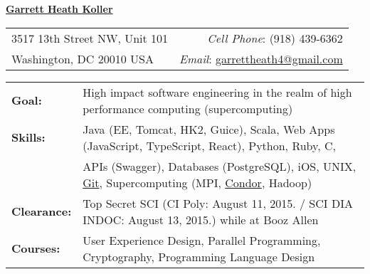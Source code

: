 \documentclass[11pt, letterpaper]{letter}
\newlength{\firstSectionSpacing} \setlength{\firstSectionSpacing}{6pt}
\newlength{\sectionSpacing}      \setlength{\sectionSpacing}{-1pt}
\begin{document}
\sffamily

\begin{center}{
	\underline{\Large{\textbf{Garrett Heath Koller}}}
}\end{center}
\vspace{-8pt}

\begin{tabular*}{\textwidth}{l@{\extracolsep{\fill}}r}
	3517 13th Street NW, Unit 101 & \textit{Cell Phone}: (918) 439-6362 \\
	Washington, DC  20010 USA & \textit{Email}:
	\href{mailto:garrettheath4@gmail.com}{garrettheath4@gmail.com} \\
	\hline
\end{tabular*}

\vspace{\firstSectionSpacing}



\begin{tabular*}{\textwidth}{ p{2.2cm} l }
	{\large \textbf{Goal:}}      & High impact software engineering in the realm of
	                               high performance computing (supercomputing) \\
	{\large \textbf{Skills:}}    & Java (EE, Tomcat, HK2, Guice), Scala, Web Apps
	                               (JavaScript, TypeScript, React), Python, Ruby, C,
	                               \\
	                             & APIs (Swagger), Databases (PostgreSQL), iOS,
	                               UNIX,
	                               \href{https://github.com/garrettheath4}{Git},
	                               Supercomputing (MPI,
	                               \href{http://www.htcondorproject.org/}{Condor},
	                               Hadoop) \\
	{\large \textbf{Clearance:}} & Top Secret SCI (CI Poly: August 11, 2015.  /  %
	                               SCI DIA INDOC: August 13, 2015.) while at Booz
	                               Allen \\
	{\large \textbf{Courses:}}   & User Experience Design, Parallel Programming,
	                               Cryptography, Programming Language Design
\end{tabular*}

\vspace{\firstSectionSpacing}
\vspace{\sectionSpacing}
\end{document}
